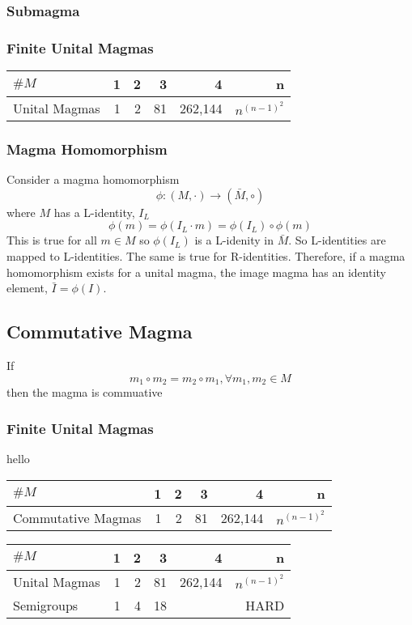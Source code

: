 \documentclass[a4paper]{scrartcl}
\begin{document}
\subsubsection{Submagma}

\subsubsection{Finite Unital Magmas}
\begin{tabular}{| l | r | r | r | r | r |} \hline
$\# M$ & 1 & 2 & 3 & 4 & n \\ \hline
Unital Magmas & 1 & 2 & 81 & 262,144 & $n^{(n-1)^2}$ \\ \hline
\end{tabular}

\subsubsection{Magma Homomorphism}
Consider a magma homomorphism
$$\phi\colon (M, \cdot) \rightarrow (\bar{M}, \circ)$$
where $M$ has a L-identity, $I_{L}$
$$\phi(m) = \phi(I_{L} \cdot m) = \phi(I_{L}) \circ \phi(m)$$
This is true for all $m\in M$ so $\phi(I_{L})$ is a L-idenity in $\bar{M}$. So L-identities are mapped to L-identities. The same is true for R-identities. Therefore, if a magma homomorphism exists for a unital magma, the image magma has an identity element, $\bar{I} = \phi(I)$.\\

\subsection{Commutative Magma}
If
$$m_{1}\circ m_{2} = m_{2}\circ m_{1}, \forall m_{1}, m_{2} \in M$$
then the magma is commuative
\subsubsection{Finite Unital Magmas}
hello
\begin{tabular}{| l | r | r | r | r | r |} \hline
$\# M$ & 1 & 2 & 3 & 4 & n \\ \hline
Commutative Magmas & 1 & 2 & 81 & 262,144 & $n^{(n-1)^2}$ \\ \hline
\end{tabular}

\begin{tabular}{| l | r | r | r | r | r |} \hline
$\# M$ & 1 & 2 & 3 & 4 & n \\ \hline
Unital Magmas & 1 & 2 & 81 & 262,144 & $n^{(n-1)^2}$ \\ \hline
Semigroups & 1 & 4 & 18 &  & HARD \\ \hline
\end{tabular}
\end{document}

